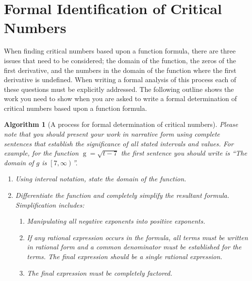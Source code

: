 \documentclass[12pt,]{book}
\theoremstyle{plain}
\newtheorem{algorithm}[theorem]{Algorithm}
\theoremstyle{definition}
\numberwithin{equation}{section}
\newcommand{\fe}[2]{\mathop{{#1}{\left(#2\right)}}}
\newcommand{\cointerval}[2]{\left[\left.#1,#2\right)\right.}
\begin{document}
\section[Formal Identification of Critical Numbers]{Formal Identification of Critical Numbers}\label{section-formal-identification-of-critical-numbers}
When finding critical numbers based upon a function formula, there are three issues that need to be considered; the domain of the function, the zeros of the first derivative, and the numbers in the domain of the function where the first derivative is undefined.  When writing a formal analysis of this process each of these questions must be explicitly addressed.  The following outline shows the work you need to show when you are asked to write a formal determination of critical numbers based upon a function formula.%
\begin{algorithm}[A process for formal determination of critical numbers]\label{algorithm-find-critical-numbers}
Please note that you should present your work in narrative form using complete sentences that establish the significance of all stated intervals and values.  For example, for the function \(\fe{g}{t}=\sqrt{t-7}\) the first sentence you should write is ``The domain of \(g\) is \(\cointerval{7}{\infty}\)''.%
\begin{enumerate}
\item{}Using interval notation, state the domain of the function.\item{}Differentiate the function and completely simplify the resultant formula.  Simplification includes:
                    \begin{enumerate}
\item{}Manipulating all negative exponents into positive exponents.\item{}If any rational expression occurs in the formula, all terms must be written in rational form and a common denominator must be established for the terms.  The final expression should be a single rational expression.\item{}The final expression must be completely factored.\end{enumerate}


\end{enumerate}
\end{algorithm}
\end{document}
